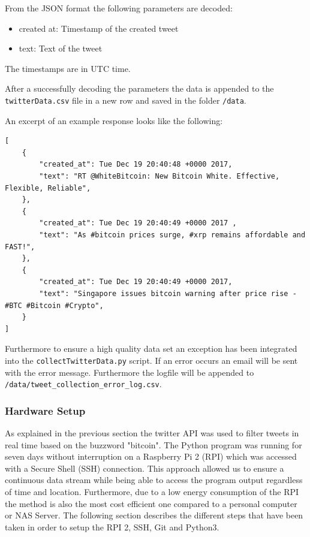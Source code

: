 \documentclass[a4paper,12pt]{article}
\begin{document}
\begin{spacing}{1.2}
From the JSON format the following parameters are decoded:
\begin{itemize}
    \item created at: Timestamp of the created tweet
    \item text: Text of the tweet
\end{itemize}
The timestamps are in UTC time.

After a successfully decoding the parameters the data is appended to the \verb|twitterData.csv| file in a new row and saved in the folder \verb|/data|.

An excerpt of an example response looks like the following:
\begin{lstlisting}
[
    {
        "created_at": Tue Dec 19 20:40:48 +0000 2017, 
        "text": "RT @WhiteBitcoin: New Bitcoin White. Effective, Flexible, Reliable", 
    }, 
    {
        "created_at": Tue Dec 19 20:40:49 +0000 2017 ,
        "text": "As #bitcoin prices surge, #xrp remains affordable and FAST!",
    }, 
    {
        "created_at": Tue Dec 19 20:40:49 +0000 2017, 
        "text": "Singapore issues bitcoin warning after price rise - #BTC #Bitcoin #Crypto", 
    }
]
\end{lstlisting}

Furthermore to ensure a high quality data set an exception has been integrated into the \verb|collectTwitterData.py| script. If an error occurs an email will be sent with the error message. Furthermore the logfile will be  appended to \verb|/data/tweet_collection_error_log.csv|.

\subsubsection{Hardware Setup}
As explained in the previous section the twitter API was used to filter tweets in real time based on the buzzword "bitcoin". The Python program was running for seven days without interruption on a Raspberry Pi 2 (RPI) which was accessed with a Secure Shell (SSH) connection. This approach allowed us to ensure a continuous data stream while being able to access the program output regardless of time and location. Furthermore, due to a low energy consumption of the RPI the method is also the most cost efficient one compared to a personal computer or NAS Server. The following section describes the different steps that have been taken in order to setup the RPI 2, SSH, Git and Python3.\newline 


\end{spacing}
\end{document}
